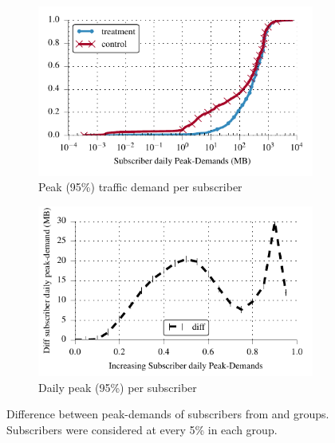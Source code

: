 \begin{figure}[t]
\begin{minipage}{1\linewidth}
\centering
%
\begin{subfigure}[b]{1\linewidth}
 \includegraphics[width=\linewidth]{figures/cdf_peak_demand-daily.pdf}
                \caption{Peak (95\%) traffic demand per subscriber\label{fig:CDF-data-rate-daily-perc95}}
 \end{subfigure}
% 
\begin{subfigure}[b]{.99\linewidth}
\includegraphics[width=\linewidth]{figures/diff_perc95_bytes_subsc-daily-overall.pdf}
                \caption{Daily peak (95\%) per subscriber\label{fig:diff-peak-daily}}
\end{subfigure}
%
\end{minipage}
  \caption{Difference between peak-demands of subscribers from \treatment{} and
  \control{} groups. Subscribers were considered at every 5\% in each group.
  \label{fig:traffic-demand-daily}}
\end{figure}


